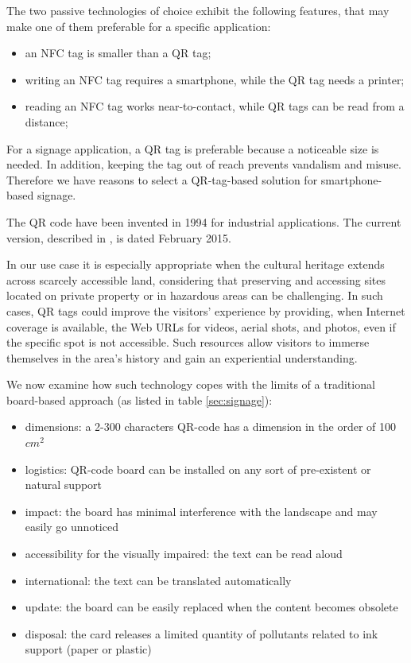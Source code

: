 \documentclass[sustainability,article,submit,pdftex,moreauthors]{Definitions/mdpi}
\begin{document}
The two passive technologies of choice exhibit the following features, that may make one of them preferable for a specific application:

\begin{itemize}
	\item an NFC tag is smaller than a QR tag;
	\item writing an NFC tag requires a smartphone, while the QR tag needs a printer;
	\item reading an NFC tag works near-to-contact, while QR tags can be read from a distance;
\end{itemize}


For a signage application, a QR tag is preferable because a noticeable size is needed. In addition, keeping the tag out of reach prevents vandalism and misuse.  Therefore we have reasons to select a QR-tag-based solution for smartphone-based signage.

The QR code have been invented in 1994 for industrial applications. The current version, described in \cite{isoqr}, is dated February 2015.

In our use case it is especially appropriate when the cultural heritage extends across scarcely accessible land, considering that preserving and accessing sites located on private property or in hazardous areas can be challenging. In such cases, QR tags could improve the visitors’ experience by providing, when Internet coverage is available, the Web URLs for videos, aerial shots, and photos, even if the specific spot is not accessible. Such resources allow visitors to immerse themselves in the area's history and gain an experiential understanding.

We now examine how such technology copes with the limits of a traditional board-based approach (as listed in table \ref{sec:signage}):

\begin{itemize}
	\item dimensions: a 2-300 characters QR-code has a dimension in the order of 100 $cm^2$
	\item logistics: QR-code board can be installed on any sort of pre-existent or natural support
	\item impact: the board has minimal interference with the landscape and may easily go unnoticed
	\item accessibility for the visually impaired: the text can be read aloud
	\item international: the text can be translated automatically
	\item update: the board can be easily replaced when the content becomes obsolete
	\item disposal: the card releases a limited quantity of pollutants related to ink support (paper or plastic)
\end{itemize}
		
\end{document}
